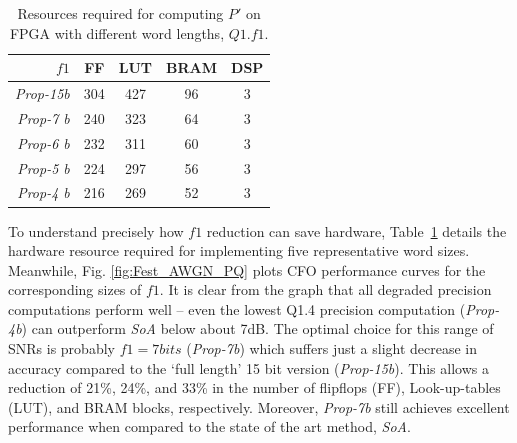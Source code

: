 \begin{table}[hb]
	\centering
	\caption{Resources required for computing $P'$ on FPGA with different word lengths, $Q1.f1$.}
	\label{tab:P-Metric}
	\begin{tabular}{r|c|c|c|c}
        \hline \hline
    			 {$f1$}	&  {FF}	&  {LUT}  &  {BRAM} &  {DSP}\\
	\hline
		\textit{Prop-15b}	& 304 	& 427 	& 96	& 3 \\
		\textit{Prop-7 b}		& 240 	& 323	& 64 	& 3 \\
		\textit{Prop-6 b}		& 232 	& 311	& 60 	& 3 \\
		\textit{Prop-5 b}		& 224  	& 297  	& 56	& 3 \\
		\textit{Prop-4 b}		& 216  	& 269  	& 52	& 3 \\
	\hline \hline
    \end{tabular}
\end{table}

To understand precisely how $f1$ reduction can save hardware, Table~\ref{tab:P-Metric} details the hardware resource required for implementing five representative word sizes. Meanwhile, Fig. \ref{fig:Fest_AWGN_PQ} plots CFO performance curves for the corresponding sizes of $f1$. It is clear from the graph that all degraded precision computations perform well -- even the lowest Q1.4 precision computation (\textit{Prop-4b}) can outperform \textit{SoA} below about 7dB.
The optimal choice for this range of SNRs is probably $f1=7bits$ (\textit{Prop-7b}) which suffers just a slight decrease in accuracy compared to the `full length' 15 bit version (\textit{Prop-15b}). This allows a reduction of 21\%, 24\%, and 33\% in the number of flipflops (FF), Look-up-tables (LUT), and BRAM blocks, respectively. Moreover, \textit{Prop-7b} still achieves excellent performance when compared to the state of the art method, \textit{SoA}.


